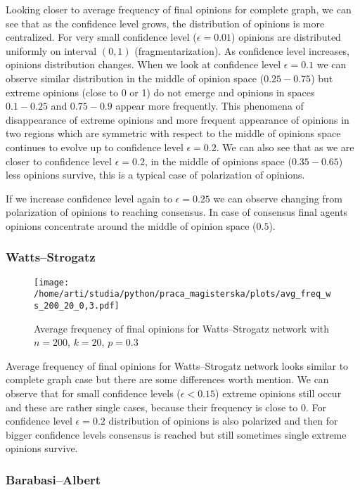\documentclass{article}
\begin{document}
Looking closer to average frequency of final opinions for complete graph, we can see that as the confidence level grows, the distribution of opinions is more centralized. For very small confidence level ($\epsilon=0.01$) opinions are distributed uniformly on interval $(0, 1)$ (fragmentarization). As confidence level increases, opinions distribution changes. When we look at confidence level $\epsilon=0.1$ we can observe similar distribution in the middle of opinion space ($0.25-0.75$) but extreme opinions (close to 0 or 1) do not emerge and opinions in spaces $0.1-0.25$ and $0.75-0.9$ appear more frequently. This phenomena of disappearance of extreme opinions and more frequent appearance of opinions in two regions which are symmetric with respect to the middle of opinions space continues to evolve up to confidence level $\epsilon=0.2$. We can also see that as we are closer to confidence level $\epsilon=0.2$, in the middle of opinions space ($0.35-0.65$) less opinions survive, this is a typical case of polarization of opinions.
\indent

If we increase confidence level again to $\epsilon=0.25$ we can observe changing from polarization of opinions to reaching consensus. In case of consensus final agents opinions concentrate around the middle of opinion space ($0.5$).


\subsubsection{Watts--Strogatz}

\begin{figure}[H]
		\centering
		\texttt{[image: /home/arti/studia/python/praca\_magisterska/plots/avg\_freq\_ws\_200\_20\_0,3.pdf]}
		\caption{Average frequency of final opinions for Watts--Strogatz network with $n=200$, $k=20$, $p=0.3$}
\end{figure}

Average frequency of final opinions for Watts--Strogatz network looks similar to complete graph case but there are some differences worth mention. We can observe that for small confidence levels ($\epsilon<0.15$) extreme opinions still occur and these are rather single cases, because their frequency is close to 0. For confidence level $\epsilon=0.2$ distribution of opinions is also polarized and then for bigger confidence levels consensus is reached but still sometimes single extreme opinions survive.

\subsubsection{Barabasi--Albert}
\end{document}

